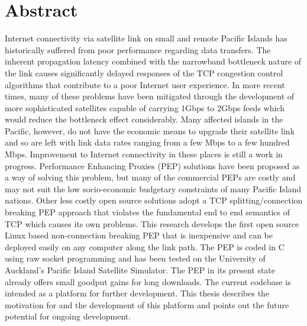 
\chapter*{Abstract}

Internet connectivity via satellite link on small and remote Pacific Islands has historically suffered from poor performance regarding data transfers. The inherent propagation latency combined with the narrowband bottleneck nature of the link causes significantly delayed responses of the TCP congestion control algorithms that contribute to a poor Internet user experience. In more recent times, many of these problems have been mitigated through the development of more sophisticated satellites capable of carrying 1Gbps to 2Gbps feeds which would reduce the bottleneck effect considerably. Many affected islands in the Pacific, however, do not have the economic means to upgrade their satellite link and so are left with link data rates ranging from a few Mbps to a few hundred Mbps. Improvement to Internet connectivity in these places is still a work in progress. Performance Enhancing Proxies (PEP) solutions have been proposed as a way of solving this problem, but many of the commercial PEPs are costly and may not suit the low socio-economic budgetary constraints of many Pacific Island nations. Other less costly open source solutions adopt a TCP splitting/connection breaking PEP approach that violates the fundamental end to end semantics of TCP which causes its own problems. This research develops the first open source Linux based non-connection breaking PEP that is inexpensive and can be deployed easily on any computer along the link path. The PEP is coded in C using raw socket programming and has been tested on the University of Auckland's Pacific Island Satellite Simulator. The PEP in its present state already offers small goodput gains for long downloads. The current codebase is intended as a platform for further development. This thesis describes the motivation for and the development of this platform and points out the future potential for ongoing development.




